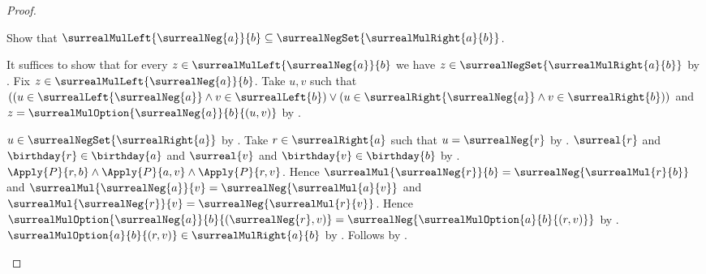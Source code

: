 \begin{proof}
\begin{subproof}
        Show that $\surrealMulLeft{\surrealNeg{a}}{b}
            \subseteq\surrealNegSet{\surrealMulRight{a}{b}}$.
        \begin{subproof}
            It suffices to show that for every
                $z\in\surrealMulLeft{\surrealNeg{a}}{b}$ we have
                $z\in\surrealNegSet{\surrealMulRight{a}{b}}$
                by .
            Fix $z\in\surrealMulLeft{\surrealNeg{a}}{b}$.
            Take $u,v$ such that
                $((u\in\surrealLeft{\surrealNeg{a}}\land
                    v\in\surrealLeft{b})
                  \lor
                  (u\in\surrealRight{\surrealNeg{a}}\land
                    v\in\surrealRight{b}))$
                and $z=\surrealMulOption{\surrealNeg{a}}{b}{(u,v)}$
                by .
            \begin{byCase}
                    $u\in\surrealNegSet{\surrealRight{a}}$
                        by .
                    Take $r\in\surrealRight{a}$ such that
                        $u=\surrealNeg{r}$
                        by .
                    $\surreal{r}$ and
                        $\birthday{r}\in\birthday{a}$ and
                        $\surreal{v}$ and
                        $\birthday{v}\in\birthday{b}$
                        by .
                    $\Apply{P}{r,b}\land
                        \Apply{P}{a,v}\land
                        \Apply{P}{r,v}$.
                    Hence
                        $\surrealMul{\surrealNeg{r}}{b}
                            =\surrealNeg{\surrealMul{r}{b}}$ and
                        $\surrealMul{\surrealNeg{a}}{v}
                            =\surrealNeg{\surrealMul{a}{v}}$ and
                        $\surrealMul{\surrealNeg{r}}{v}
                            =\surrealNeg{\surrealMul{r}{v}}$.
                    Hence
                        $\surrealMulOption{\surrealNeg{a}}{b}
                            {(\surrealNeg{r},v)}
                        =\surrealNeg{\surrealMulOption{a}{b}{(r,v)}}$
                        by .
                    $\surrealMulOption{a}{b}{(r,v)}
                        \in\surrealMulRight{a}{b}$
                        by .
                    Follows by .
\end{byCase}
\end{subproof}
\end{subproof}
\end{proof}
